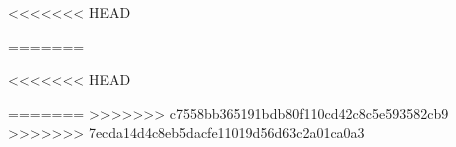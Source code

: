 
\raggedbottom

<<<<<<< HEAD
\tableofcontents



=======
\tableofcontents*



<<<<<<< HEAD

=======
>>>>>>> c7558bb365191bdb80f110cd42c8c5e593582cb9
>>>>>>> 7ecda14d4c8eb5dacfe11019d56d63c2a01ca0a3
\begingroup
	\raggedright
	
\endgroup


